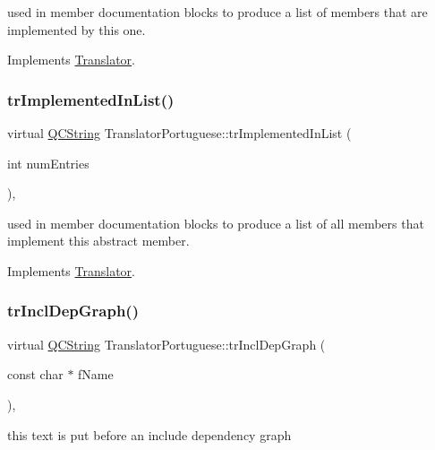 used in member documentation blocks to produce a list of members that are implemented by this one. 

Implements \mbox{\hyperlink{class_translator}{Translator}}.

\mbox{\label{class_translator_portuguese_a0ede69fe6802ec86184ba3e2c259e94d}} 
\subsubsection{\texorpdfstring{trImplementedInList()}{trImplementedInList()}}
{\footnotesize\ttfamily virtual \mbox{\hyperlink{class_q_c_string}{Q\+C\+String}} Translator\+Portuguese\+::tr\+Implemented\+In\+List (\begin{DoxyParamCaption}\item[{int}]{num\+Entries }\end{DoxyParamCaption})\hspace{0.3cm}{\ttfamily [inline]}, {\ttfamily [virtual]}}

used in member documentation blocks to produce a list of all members that implement this abstract member. 

Implements \mbox{\hyperlink{class_translator}{Translator}}.

\mbox{\label{class_translator_portuguese_ad46a07d2fef1865f23f4b907165d1213}} 
\subsubsection{\texorpdfstring{trInclDepGraph()}{trInclDepGraph()}}
{\footnotesize\ttfamily virtual \mbox{\hyperlink{class_q_c_string}{Q\+C\+String}} Translator\+Portuguese\+::tr\+Incl\+Dep\+Graph (\begin{DoxyParamCaption}\item[{const char $\ast$}]{f\+Name }\end{DoxyParamCaption})\hspace{0.3cm}{\ttfamily [inline]}, {\ttfamily [virtual]}}

this text is put before an include dependency graph 

